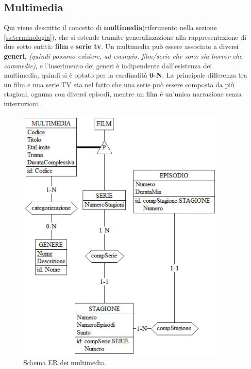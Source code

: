 \documentclass[a4paper,12pt]{report}
\begin{document}
\subsection{Multimedia}
Qui viene descritto il concetto di \textbf{multimedia}(riferimento nella sezione \ref{ss:terminologia}), che si estende tramite generalizzazione alla rappresentazione di due sotto entità: \textbf{film} e \textbf{serie tv}. Un multimedia può essere associato a diversi \textbf{generi}, \textit{(quindi possono esistere, ad esempio, film/serie che sono sia horror che commedie)}, e l'inserimento dei generi è indipendente dall'esistenza dei multimedia, quindi si è optato per la cardinalità \textbf{0-N}. La principale differenza tra un film e una serie TV sta nel fatto che una serie può essere composta da più stagioni, ognuna con diversi episodi, mentre un film è un'unica narrazione senza interruzioni.
\begin{figure}[H]
	\centering
	\includegraphics[width=300pt]{ER/multimedia.png}
	\caption{Schema ER dei multimedia.}
\end{figure}
\end{document}
